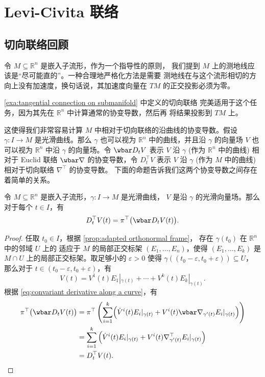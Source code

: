 

\chapter{Levi-Civita 联络}

\section{切向联络回顾}

令 $M\subseteq \mathbb{R}^n$ 是嵌入子流形，作为一个指导性的原则，
我们提到 $M$ 上的测地线应该是“尽可能直的”。一种合理地严格化方法是需要
测地线在与这个流形相切的方向上没有加速度，换句话说，其加速度向量在 $TM$
的正交投影必须为零。

\autoref{exa:tangential connection on submanifold} 中定义的切向联络
完美适用于这个任务，因为其先在 $\mathbb{R}^n$ 中计算通常的协变导数，然后再
将结果投影到 $TM$ 上。

这使得我们非常容易计算 $M$ 中相对于切向联络的沿曲线的协变导数。假设 $\gamma:I\to M$
是光滑曲线。那么 $\gamma$ 也可以视为 $\mathbb{R}^n$ 中的曲线，并且沿 $\gamma$
的向量场 $V$ 也可以视为 $\mathbb{R}^n$ 中沿 $\gamma$ 的向量场。令
$\wbar D_tV$ 表示 $V$ 沿 $\gamma$ (作为 $\mathbb{R}^n$ 中的曲线) 
相对于 Euclid 联络 $\wbar \nabla$ 的协变导数，令 $D_t^\top V$
表示 $V$ 沿 $\gamma$ (作为 $M$ 中的曲线) 相对于切向联络 $\nabla^\top$ 的协变导数。
下面的命题告诉我们这两个协变导数之间存在着简单的关系。

\begin{proposition}
  令 $M\subseteq \mathbb{R}^n$ 是嵌入子流形，$\gamma:I\to M$ 是光滑曲线，
  $V$ 是沿 $\gamma$ 的光滑向量场。那么对于每个 $t\in I$，有
  \[
    D_t^\top V(t)=\pi^\top\bigl(\wbar D_tV(t)\bigr).
  \] 
\end{proposition}
\begin{proof}
  任取 $t_0\in I$，根据 \autoref{prop:adapted orthonormal frame}，
  存在 $\gamma(t_0)$ 在 $\mathbb{R}^n$ 中的邻域 $U$ 上的
  适应于 $M$ 的局部正交标架 $(E_1,\dots,E_n)$，使得 $(E_1,\dots,E_k)$
  是 $M\cap U$ 上的局部正交标架。取足够小的 $\varepsilon>0$ 使得
  $\gamma((t_0-\varepsilon,t_0+\varepsilon))\subseteq U$，
  那么对于 $t\in (t_0-\varepsilon,t_0+\varepsilon)$，有
  \[
    V(t)=V^1(t)E_1|_{\gamma(t)}+\cdots+V^k(t)E_k|_{\gamma(t)}.
  \]
  根据 \eqref{eq:convariant derivative along a curve}，有
  \begin{align*}
    \pi^\top\bigl(\wbar D_tV(t)\bigr)&=\pi^\top
    \left(
        \sum_{i=1}^k\Bigl(
            \dot V^i(t)E_i|_{\gamma(t)}+V^i(t)\wbar\nabla_{\gamma'(t)}E_i|_{\gamma(t)}
        \Bigr)
    \right)\\
    &=\sum_{i=1}^k\left(
        \dot V^i(t)E_i|_{\gamma(t)}+V^i(t)\nabla_{\gamma'(t)}^\top E_i|_{\gamma(t)}
    \right)\\
    &=D_t^\top V(t).\qedhere
  \end{align*}
\end{proof}

